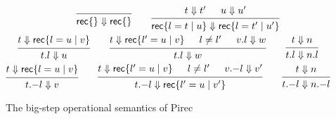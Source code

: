 \begin{figure}
\begin{gather*}
    \qquad
    \begin{prooftree}
      \infer0{\RecordLit \{ \} \Downarrow \RecordLit \{ \}}
    \end{prooftree}
    \qquad
    \begin{prooftree}
      \hypo{t \Downarrow t'}
      \hypo{u \Downarrow u'}
      \infer2{\RecordLit \{ l = t \mid u \}
        \Downarrow \RecordLit \{ l = t' \mid u' \}}
    \end{prooftree}
    \\
    \begin{prooftree}
      \hypo{t \Downarrow \RecordLit \{ l = u \mid v \}}
      \infer1{t.l \Downarrow u}
    \end{prooftree}
    \qquad
    \begin{prooftree}
      \hypo{t \Downarrow \RecordLit \{ l' = u \mid v \}}
      \hypo{l \neq l'}
      \hypo{v.l \Downarrow w}
      \infer3{t.l \Downarrow w}
    \end{prooftree}
    \qquad
    \begin{prooftree}
      \hypo{t \Downarrow n}
      \infer1{t.l \Downarrow n.l}
    \end{prooftree}
    \\
    \begin{prooftree}
      \hypo{t \Downarrow \RecordLit \{ l = u \mid v \}}
      \infer1{t \RecordRestr l \Downarrow v}
    \end{prooftree}
    \qquad
    \begin{prooftree}
      \hypo{t \Downarrow \RecordLit \{ l' = u \mid v \}}
      \hypo{l \neq l'}
      \hypo{v \RecordRestr l \Downarrow v'}
      \infer3{t \RecordRestr l \Downarrow \RecordLit \{ l' = u \mid v' \}}
    \end{prooftree}
    \qquad
    \begin{prooftree}
      \hypo{t \Downarrow n}
      \infer1{t \RecordRestr l \Downarrow n \RecordRestr l}
    \end{prooftree}
  \end{gather*}
  \caption{The big-step operational semantics of Pirec}\label{fig:big-step}
\end{figure}

